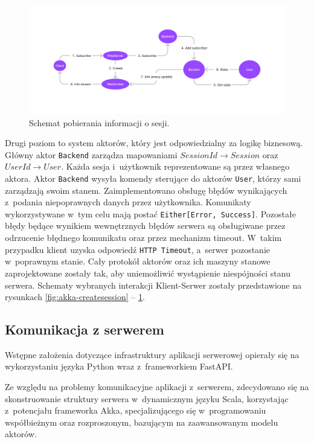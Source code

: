 \begin{figure}[!]
  \centering
  \includegraphics[width=\textwidth]{img/akka/SessionInfo.png}
  \caption{Schemat pobierania informacji o sesji.}
  \label{fig:akka-sessioninfo}
\end{figure}

Drugi poziom to system aktorów, który jest
odpowiedzialny za logikę biznesową.
Główny aktor \verb|Backend| zarządza mapowaniami
$SessionId \to Session$ oraz $UserId \to User$.
Każda sesja i~użytkownik reprezentowane są
przez własnego aktora.
Aktor \verb|Backend| wysyła komendy sterujące do
aktorów \verb|User|, którzy sami zarządzają swoim stanem.
Zaimplementowano obsługę błędów wynikających z~podania
niepoprawnych danych przez użytkownika.
Komunikaty wykorzystywane w~tym celu mają postać
\verb|Either[Error, Success]|.
Pozostałe błędy będące wynikiem wewnętrznych błędów
serwera są obsługiwane przez odrzucenie błędnego
komunikatu oraz przez mechanizm timeout.
W~takim przypadku klient uzyska odpowiedź
\verb|HTTP Timeout|, a~serwer pozostanie w~poprawnym stanie.
Cały protokół aktorów oraz ich maszyny stanowe zaprojektowane
zostały tak, aby uniemożliwić wystąpienie niespójności stanu serwera.
Schematy wybranych interakcji Klient-Serwer zostały przedstawione
na rysunkach \ref{fig:akka-createsession} -- \ref{fig:akka-sessioninfo}.

\FloatBarrier

\subsection{Komunikacja z serwerem}
Wstępne założenia dotyczące infrastruktury aplikacji
serwerowej opierały się na wykorzystaniu języka Python
wraz z~frameworkiem FastAPI.

Ze względu na problemy komunikacyjne aplikacji
z~serwerem, zdecydowano się na skonstruowanie struktury serwera
w~dynamicznym języku Scala, korzystając z~potencjału
frameworka Akka, specjalizującego się w~programowaniu
współbieżnym oraz rozproszonym, bazującym na
zaawansowanym modelu aktorów.

